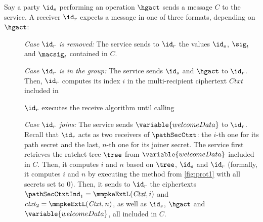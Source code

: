 Say a party $\id_s$ performing an operation $\hgact$ sends a message $C$ to the service. A receiver $\id_r$ expects a message in one of three formats, depending on $\hgact$:
\begin{description}
  \item[] {\it Case $\id_r$ is removed: } The service sends to $\id_r$ the values $\id_s$, $\sig_t$ and $\macsig_t$ contained in $C$.
  \item[] {\it Case $\id_r$ is in the group: } The service sends $\id_s$ and $\hgact$ to $\id_r$. Then, $\id_r$ computes its index $i$ in the multi-recipient ciphertext $Ctxt$ included in

$\id_r$ executes the receive algorithm until calling \decSecrets
  \item[] {\it Case $\id_r$ joins: } The service sends $\variable{welcomeData}$ to $\id_r$. Recall that $\id_r$ acts as two receivers of $\pathSecCtxt$: the $i$-th one for its path secret and the last, $n$-th one for its joiner secret. The service first retrieves the ratchet tree $\tree$ from $\variable{welcomeData}$ included in $C$. Then, it computes $i$ and $n$ based on $\tree$, $\id_s$ and $\id_r$ (formally, it computes $i$ and $n$ by executing the  method from \cref{fig:prot1} with all secrets set to $0$). Then, it sends to $\id_r$ the ciphertexts $\pathSecCtxtInd_1=\mmpkeExtL(\textit{Ctxt},i)$ and $\mathit{ctxt}_2 = \mmpkeExtL(\mathit{Ctxt},n)$, as well as $\id_s$, $\hgact$ and $\variable{welcomeData}$, all included in $C$.

\end{description}

